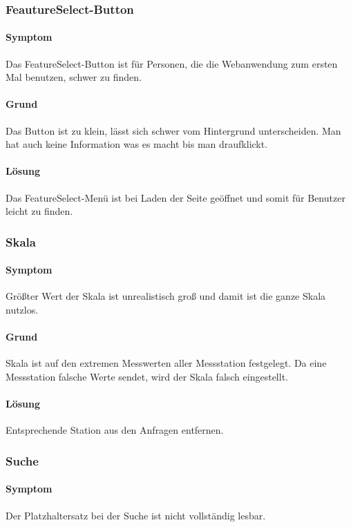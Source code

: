 \subsubsection{FeautureSelect-Button}
\paragraph{Symptom}
Das FeatureSelect-Button ist für Personen, die die Webanwendung zum ersten Mal benutzen, schwer zu finden.  

\paragraph{Grund}
Das Button ist zu klein, lässt sich schwer vom Hintergrund unterscheiden. Man hat auch keine Information was es macht bis man draufklickt.

\paragraph{Lösung}
Das FeatureSelect-Menü ist bei Laden der Seite geöffnet und somit für Benutzer leicht zu finden.

\subsubsection{Skala}
\paragraph{Symptom}
Größter Wert der Skala ist unrealistisch groß und damit ist die ganze Skala nutzlos.

\paragraph{Grund}
Skala ist auf den extremen Messwerten aller Messstation festgelegt. 
Da eine Messstation falsche Werte sendet, wird der Skala falsch eingestellt. 

\paragraph{Lösung}
Entsprechende Station aus den Anfragen entfernen.

\subsubsection{Suche}
\paragraph{Symptom}
Der Platzhaltersatz bei der Suche ist nicht vollständig lesbar.

